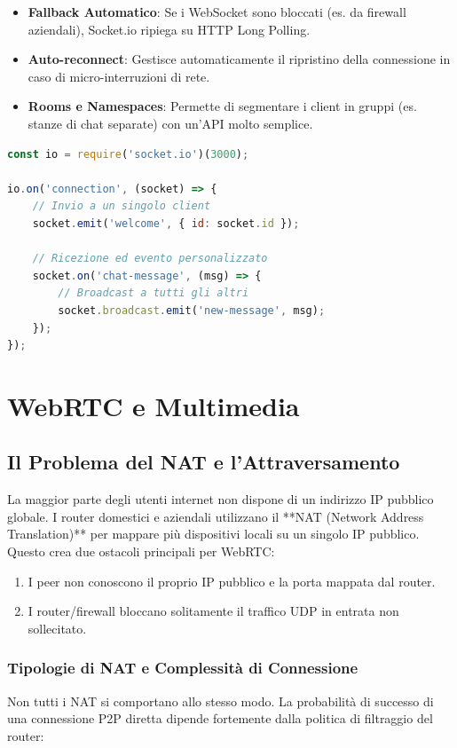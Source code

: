 \documentclass[11pt,a4paper]{report}
\begin{document}
\begin{itemize}
    \item \textbf{Fallback Automatico}: Se i WebSocket sono bloccati (es. da firewall aziendali), Socket.io ripiega su HTTP Long Polling.
    \item \textbf{Auto-reconnect}: Gestisce automaticamente il ripristino della connessione in caso di micro-interruzioni di rete.
    \item \textbf{Rooms e Namespaces}: Permette di segmentare i client in gruppi (es. stanze di chat separate) con un'API molto semplice.
\end{itemize}

\begin{lstlisting}[language=javascript, caption=Socket.io Server-side]
const io = require('socket.io')(3000);

io.on('connection', (socket) => {
    // Invio a un singolo client
    socket.emit('welcome', { id: socket.id });

    // Ricezione ed evento personalizzato
    socket.on('chat-message', (msg) => {
        // Broadcast a tutti gli altri
        socket.broadcast.emit('new-message', msg);
    });
});
\end{lstlisting}

\newpage

\chapter{WebRTC e Multimedia}

\section{Il Problema del NAT e l'Attraversamento}
La maggior parte degli utenti internet non dispone di un indirizzo IP pubblico globale. I router domestici e aziendali utilizzano il **NAT (Network Address Translation)** per mappare più dispositivi locali su un singolo IP pubblico. Questo crea due ostacoli principali per WebRTC:
\begin{enumerate}
    \item I peer non conoscono il proprio IP pubblico e la porta mappata dal router.
    \item I router/firewall bloccano solitamente il traffico UDP in entrata non sollecitato.
\end{enumerate}

\subsection{Tipologie di NAT e Complessità di Connessione}
Non tutti i NAT si comportano allo stesso modo. La probabilità di successo di una connessione P2P diretta dipende fortemente dalla politica di filtraggio del router:
\end{document}
